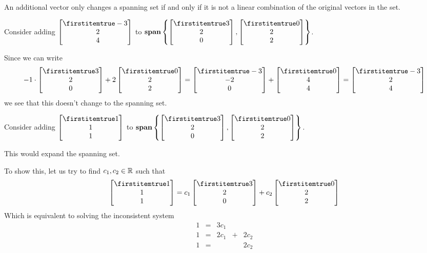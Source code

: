 \documentclass{beamer}
\begin{document}
\begin{frame}
\begin{theorem}
An additional vector only changes a spanning set if and only if it is not a linear combination of the original vectors in the set.
\end{theorem}\pause
\begin{example}
Consider adding $\bvector{-3, \+2, \+4}$ to $\spn\left\{\bvector{3,2,0},\bvector{0,2,2}\right\}$.\pause

Since we can write 
\begin{equation*}
-1\cdot\bvector{3,2,0}+2\bvector{0,2,2}=\bvector{-3,-2,0}+\bvector{0,4,4}=\bvector{-3,\+2,\+4}
\end{equation*}
we see that this doesn't change to the spanning set.
\end{example}
\end{frame}

\begin{frame}
\begin{example}
Consider adding $\bvector{1, 1, 1}$ to $\spn\left\{\bvector{3,2,0},\bvector{0,2,2}\right\}$.\pause

\vspace{2mm}
This would expand the spanning set.\pause

\vspace{2mm}
To show this, let us try to find $c_1, c_2\in\mathbb{R}$ such that
\begin{equation*}
\bvector{1,1,1}=c_1\bvector{3,2,0}+c_2\bvector{0,2,2}
\end{equation*}\pause
Which is equivalent to solving the inconsistent system
\begin{equation*}
\begin{aligned}
1 & = & 3c_1 &   &      \\
1 & = & 2c_1 & + & 2c_2 \\
1 & = &      &   & 2c_2
\end{aligned}
\end{equation*}
\end{example}
\end{frame}
\end{document}

